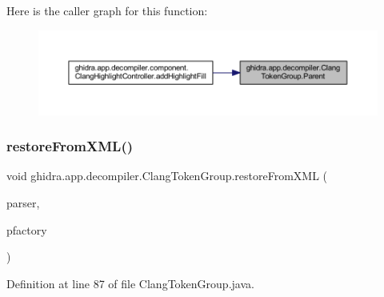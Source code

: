Here is the caller graph for this function\+:
\nopagebreak
\begin{figure}[H]
\begin{center}
\leavevmode
\includegraphics[width=350pt]{classghidra_1_1app_1_1decompiler_1_1_clang_token_group_a3f9dca7140c0110a3fa83c4b81f7886e_icgraph}
\end{center}
\end{figure}
\mbox{\label{classghidra_1_1app_1_1decompiler_1_1_clang_token_group_ad6415521aaa042312b788162e577029c}} 
\subsubsection{\texorpdfstring{restoreFromXML()}{restoreFromXML()}}
{\footnotesize\ttfamily void ghidra.\+app.\+decompiler.\+Clang\+Token\+Group.\+restore\+From\+X\+ML (\begin{DoxyParamCaption}\item[{Xml\+Pull\+Parser}]{parser,  }\item[{Pcode\+Factory}]{pfactory }\end{DoxyParamCaption})\hspace{0.3cm}{\ttfamily [inline]}}



Definition at line 87 of file Clang\+Token\+Group.\+java.

